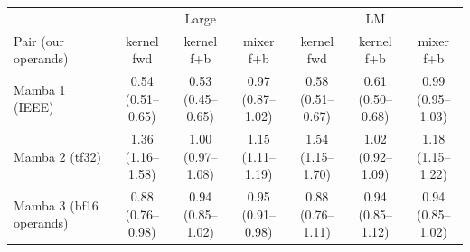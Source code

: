 \begin{tabular}{@{}l ccc ccc@{}}
\toprule
 & \multicolumn{3}{c}{Large} & \multicolumn{3}{c}{LM} \\
\cmidrule(lr){2-4}\cmidrule(lr){5-7}
Pair (our operands) & kernel fwd & kernel f+b & mixer f+b & kernel fwd & kernel f+b & mixer f+b \\
\midrule
Mamba 1 (IEEE) & \shortstack{0.54\\{\tiny (0.51--0.65)}} & \shortstack{0.53\\{\tiny (0.45--0.65)}} & \shortstack{0.97\\{\tiny (0.87--1.02)}} & \shortstack{0.58\\{\tiny (0.51--0.67)}} & \shortstack{0.61\\{\tiny (0.50--0.68)}} & \shortstack{0.99\\{\tiny (0.95--1.03)}} \\
Mamba 2 (tf32) & \shortstack{1.36\\{\tiny (1.16--1.58)}} & \shortstack{1.00\\{\tiny (0.97--1.08)}} & \shortstack{1.15\\{\tiny (1.11--1.19)}} & \shortstack{1.54\\{\tiny (1.15--1.70)}} & \shortstack{1.02\\{\tiny (0.92--1.09)}} & \shortstack{1.18\\{\tiny (1.15--1.22)}} \\
Mamba 3 (bf16 operands) & \shortstack{0.88\\{\tiny (0.76--0.98)}} & \shortstack{0.94\\{\tiny (0.85--1.02)}} & \shortstack{0.95\\{\tiny (0.91--0.98)}} & \shortstack{0.88\\{\tiny (0.76--1.11)}} & \shortstack{0.94\\{\tiny (0.85--1.12)}} & \shortstack{0.94\\{\tiny (0.85--1.02)}} \\
\bottomrule
\end{tabular}
